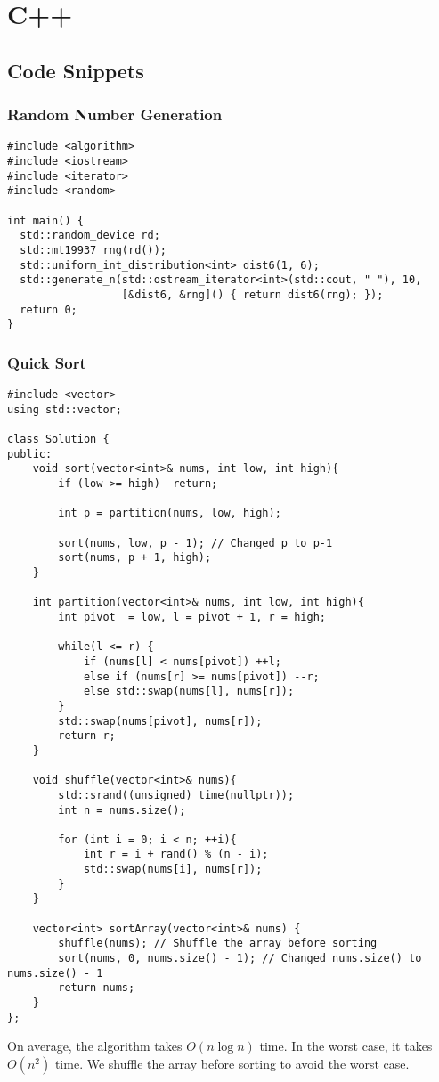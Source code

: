 \chapter{C++}\label{chp:c++}
\minitoc


\section{Code Snippets}

\subsection{Random Number Generation}

\begin{verbatim}
#include <algorithm>
#include <iostream>
#include <iterator>
#include <random>

int main() {
  std::random_device rd;
  std::mt19937 rng(rd());
  std::uniform_int_distribution<int> dist6(1, 6);
  std::generate_n(std::ostream_iterator<int>(std::cout, " "), 10,
                  [&dist6, &rng]() { return dist6(rng); });
  return 0;
}
\end{verbatim}


\subsection{Quick Sort}

\begin{verbatim}
#include <vector>
using std::vector;

class Solution {
public:
    void sort(vector<int>& nums, int low, int high){
        if (low >= high)  return;

        int p = partition(nums, low, high);

        sort(nums, low, p - 1); // Changed p to p-1
        sort(nums, p + 1, high);
    }

    int partition(vector<int>& nums, int low, int high){
        int pivot  = low, l = pivot + 1, r = high;

        while(l <= r) {
            if (nums[l] < nums[pivot]) ++l;
            else if (nums[r] >= nums[pivot]) --r;
            else std::swap(nums[l], nums[r]);
        }
        std::swap(nums[pivot], nums[r]);
        return r;
    }

    void shuffle(vector<int>& nums){
        std::srand((unsigned) time(nullptr));
        int n = nums.size();

        for (int i = 0; i < n; ++i){
            int r = i + rand() % (n - i);
            std::swap(nums[i], nums[r]);
        }
    }

    vector<int> sortArray(vector<int>& nums) {
        shuffle(nums); // Shuffle the array before sorting
        sort(nums, 0, nums.size() - 1); // Changed nums.size() to nums.size() - 1
        return nums;
    }
};
\end{verbatim}

On average, the algorithm takes $O\left(n\log n\right)$ time. In the worst case, it takes $O\left(n^2\right)$ time.
We shuffle the array before sorting to avoid the worst case.

